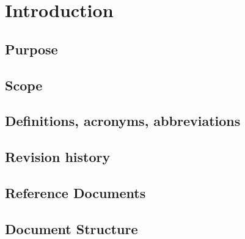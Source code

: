 \section{Introduction}

\subsection{Purpose}
\subsection{Scope}
\subsection{Definitions, acronyms, abbreviations}
\subsection{Revision history}
\subsection{Reference Documents}
\subsection{Document Structure}